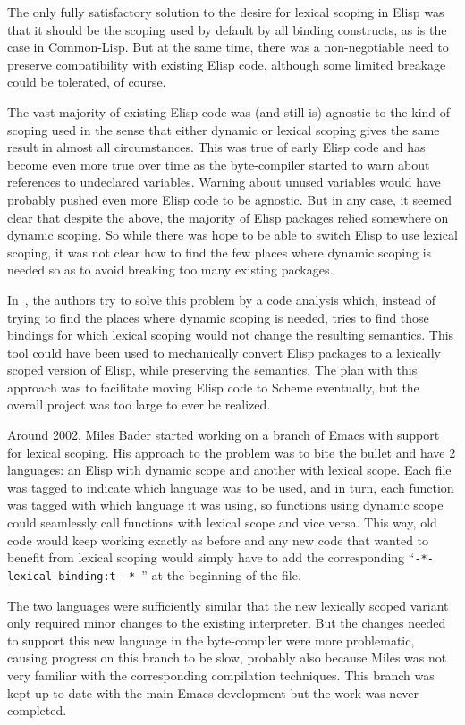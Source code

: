 \documentclass[format=acmsmall, review=false, screen=true]{acmart}
\newcommand \Elisp {Elisp}
\begin{document}
The only fully satisfactory solution to the desire for lexical scoping in
\Elisp{} was that it should be the scoping used by default by all binding
constructs, as is the case in Common-Lisp.  But at the same time, there was
a non-negotiable need to preserve compatibility with existing \Elisp{} code,
although some limited breakage could be tolerated, of course.

The vast majority of existing \Elisp{} code was (and still is) agnostic to
the kind of scoping used in the sense that either dynamic or lexical scoping
gives the same result in almost all circumstances.  This was true of early
\Elisp{} code and has become even more true over time as the byte-compiler
started to warn about references to undeclared variables.  Warning about
unused variables would have probably pushed even more \Elisp{} code to be
agnostic.  But in any case, it seemed clear that despite the above, the
majority of Elisp packages relied somewhere on dynamic scoping.  So while
there was hope to be able to switch \Elisp{} to use lexical scoping, it was
not clear how to find the few places where dynamic scoping is needed so as
to avoid breaking too many existing packages.

In~\cite{Neubauer01}, the authors try to solve this problem by a code
analysis which, instead of trying to find the places where dynamic scoping is
needed, tries to find those bindings for which lexical scoping would not
change the resulting semantics.  This tool could have been used to
mechanically convert \Elisp{} packages to a lexically scoped version of
\Elisp{}, while preserving the semantics.  The plan with this approach
was to facilitate moving \Elisp{} code to Scheme eventually, but the
overall project was too large to ever be realized.

Around 2002, Miles Bader started working on a branch of Emacs with support
for lexical scoping.  His approach to the problem was to bite the bullet and
have 2 languages: an \Elisp{} with dynamic scope and another with lexical
scope.  Each file was tagged to indicate which language was to be used, and
in turn, each function was tagged with which language it was using, so
functions using dynamic scope could seamlessly call functions with lexical
scope and vice versa.  This way, old code would keep working exactly as
before and any new code that wanted to benefit from lexical scoping would
simply have to add the corresponding ``\texttt{-*- lexical-binding:t -*-}''
at the beginning of the file.

The two languages were sufficiently similar that the new lexically scoped
variant only required minor changes to the existing interpreter.  But the
changes needed to support this new language in the byte-compiler were more
problematic, causing progress on this branch to be slow, probably also
because Miles was not very familiar with the corresponding
compilation techniques.  This branch was kept up-to-date with the main Emacs
development but the work was never completed.
\end{document}

